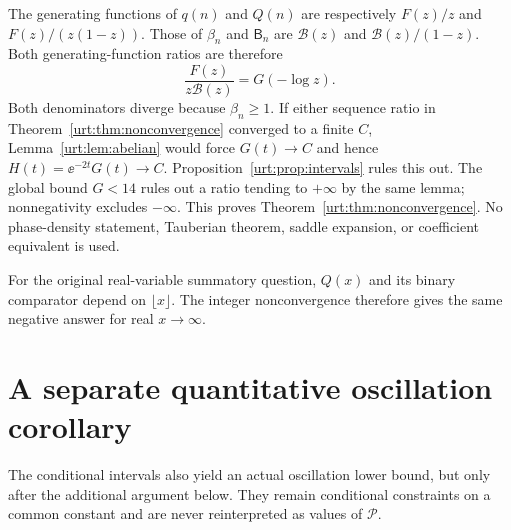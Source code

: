 \documentclass[11pt,letterpaper]{article}
\theoremstyle{remark}\newtheorem{remark}[theorem]{Remark}
\newcommand{\Beta}{\mathsf B}
\newcommand{\Pc}{\mathcal P}\newcommand{\Bc}{\mathcal B}\newcommand{\dd}{\mathrm d}
\begin{document}
The generating functions of $q(n)$ and $Q(n)$ are respectively $F(z)/z$ and $F(z)/(z(1-z))$. Those of $\beta_n$ and $\Beta_n$ are $\Bc(z)$ and $\Bc(z)/(1-z)$. Both generating-function ratios are therefore
\begin{equation}\label{urt:eq:abelratio}
 \frac{F(z)}{z\Bc(z)}=G(-\log z).
\end{equation}
Both denominators diverge because $\beta_n\ge1$. If either sequence ratio in Theorem~\ref{urt:thm:nonconvergence} converged to a finite $C$, Lemma~\ref{urt:lem:abelian} would force $G(t)\to C$ and hence $H(t)=\ee^{-2t}G(t)\to C$. Proposition~\ref{urt:prop:intervals} rules this out. The global bound $G<14$ rules out a ratio tending to $+\infty$ by the same lemma; nonnegativity excludes $-\infty$. This proves Theorem~\ref{urt:thm:nonconvergence}. No phase-density statement, Tauberian theorem, saddle expansion, or coefficient equivalent is used.

For the original real-variable summatory question, $Q(x)$ and its binary comparator depend on $\lfloor x\rfloor$. The integer nonconvergence therefore gives the same negative answer for real $x\to\infty$.

\section{A separate quantitative oscillation corollary}\label{urt:sec:oscillation}
The conditional intervals also yield an actual oscillation lower bound, but only after the additional argument below. They remain conditional constraints on a common constant and are never reinterpreted as values of $\Pc$.
\end{document}
